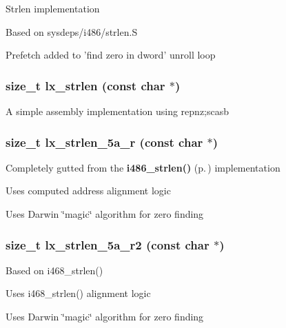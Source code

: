 Strlen implementation\begin{CompactItemize}
\item 
Based on sysdeps/i486/strlen.S \item 
Prefetch added to 'find zero in dword' unroll loop \end{CompactItemize}
\subsubsection{\setlength{\rightskip}{0pt plus 5cm}size\_\-t lx\_\-strlen (const char $\ast$)}\label{strlen_2def__test_8h_a7}


A simple assembly implementation using repnz;scasb 
\subsubsection{\setlength{\rightskip}{0pt plus 5cm}size\_\-t lx\_\-strlen\_\-5a\_\-r (const char $\ast$)}\label{strlen_2def__test_8h_a6}


Completely gutted from the {\bf i486\_\-strlen()} {\rm (p.\,\pageref{strlen_2def__test_8h_a4})} implementation\begin{CompactItemize}
\item 
Uses computed address alignment logic\item 
Uses Darwin \char`\"{}magic\char`\"{} algorithm for zero finding \end{CompactItemize}
\subsubsection{\setlength{\rightskip}{0pt plus 5cm}size\_\-t lx\_\-strlen\_\-5a\_\-r2 (const char $\ast$)}\label{strlen_2def__test_8h_a5}


Based on i468\_\-strlen()\begin{CompactItemize}
\item 
Uses i468\_\-strlen() alignment logic\item 
Uses Darwin \char`\"{}magic\char`\"{} algorithm for zero finding \end{CompactItemize}
